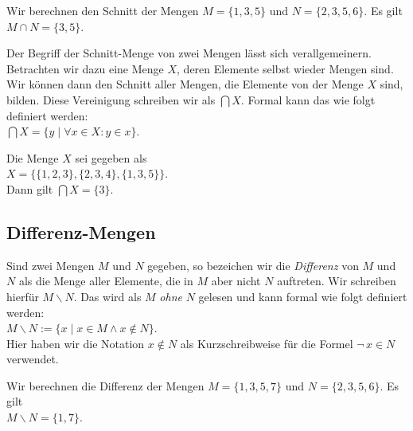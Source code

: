 \example
Wir berechnen den Schnitt der  Mengen $M = \{ 1, 3, 5 \}$ und $N = \{ 2, 3, 5, 6 \}$.  Es gilt
\\[0.2cm]
\hspace*{1.3cm} $M \cap N = \{ 3, 5 \}$.
\eox
\vspace{0.2cm}

\noindent
Der Begriff der Schnitt-Menge von zwei Mengen l\"{a}sst sich verallgemeinern.  Betrachten
wir dazu eine Menge $X$, deren Elemente selbst wieder Mengen sind.  Wir k\"{o}nnen dann den
Schnitt aller Mengen, die Elemente von der Menge $X$ sind, bilden.  Diese Vereinigung
schreiben wir als $\bigcap X$.  Formal kann das wie folgt definiert werden: \\[0.2cm]
\hspace*{1.3cm} $\bigcap X = \{ y \;|\; \forall x \in X: y \in x \}$.

\example
Die Menge $X$ sei gegeben als
\\[0.2cm]
\hspace*{1.3cm}
$X = \bigl\{ \{ 1, 2, 3 \}, \{ 2, 3, 4 \}, \{ 1, 3, 5 \} \bigr\}$. 
\\[0.2cm]
Dann gilt $\bigcap X = \{ 3 \}$.  \eox

\subsection{Differenz-Mengen}
 Sind zwei Mengen $M$ und $N$ gegeben, so bezeichen wir die \emph{Differenz} von
 $M$ und $N$ als die Menge aller Elemente, die in $M$ aber nicht $N$
 auftreten.  Wir schreiben hierf\"{u}r $M \backslash N$.  Das wird als $M$ \emph{ohne} $N$
gelesen und kann formal wie folgt definiert werden: 
\\[0.2cm]
\hspace*{1.3cm} $M \backslash N := \{ x \mid x \in M \wedge x \not\in N \}$. 
\\[0.2cm]
Hier haben wir die Notation $x \not\in N$ als Kurzschreibweise f\"{u}r die Formel $\neg\, x \in N$ 
verwendet.
\pagebreak


\example
Wir berechnen die Differenz der Mengen $M = \{ 1, 3, 5, 7 \}$ und $N = \{ 2, 3, 5, 6 \}$.  Es gilt
\\[0.2cm]
\hspace*{1.3cm}
$M \backslash N = \{ 1, 7 \}$. \eox



